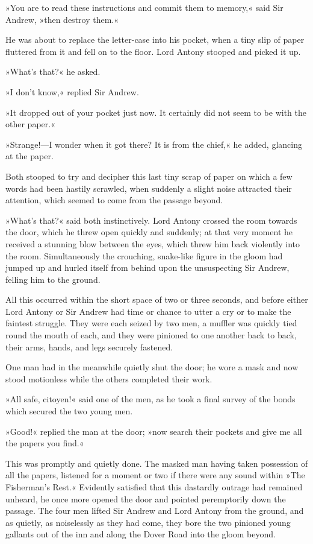 »You are to read these instructions and commit them to memory,« said Sir Andrew, »then destroy them.«

He was about to replace the letter-case into his pocket, when a tiny slip of paper fluttered from it and fell on to the floor. Lord Antony stooped and picked it up.

»What's that?« he asked.

»I don't know,« replied Sir Andrew.

»It dropped out of your pocket just now. It certainly did not seem to be with the other paper.«

»Strange!\allowbreak---\allowbreak I wonder when it got there? It is from the chief,« he added, glancing at the paper.

Both stooped to try and decipher this last tiny scrap of paper on which a few words had been hastily scrawled, when suddenly a slight noise attracted their attention, which seemed to come from the passage beyond.

»What's that?« said both instinctively. Lord Antony crossed the room towards the door, which he threw open quickly and suddenly; at that very moment he received a stunning blow between the eyes, which threw him back violently into the room. Simultaneously the crouching, snake-like figure in the gloom had jumped up and hurled itself from behind upon the unsuspecting Sir Andrew, felling him to the ground.

All this occurred within the short space of two or three seconds, and before either Lord Antony or Sir Andrew had time or chance to utter a cry or to make the faintest struggle. They were each seized by two men, a muffler was quickly tied round the mouth of each, and they were pinioned to one another back to back, their arms, hands, and legs securely fastened.

One man had in the meanwhile quietly shut the door; he wore a mask and now stood motionless while the others completed their work.

»All safe, citoyen!« said one of the men, as he took a final survey of the bonds which secured the two young men.

»Good!« replied the man at the door; »now search their pockets and give me all the papers you find.«

This was promptly and quietly done. The masked man having taken possession of all the papers, listened for a moment or two if there were any sound within »The Fisherman's Rest.« Evidently satisfied that this dastardly outrage had remained unheard, he once more opened the door and pointed peremptorily down the passage. The four men lifted Sir Andrew and Lord Antony from the ground, and as quietly, as noiselessly as they had come, they bore the two pinioned young gallants out of the inn and along the Dover Road into the gloom beyond.

